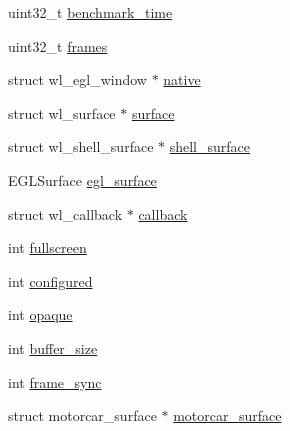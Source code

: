 \begin{DoxyCompactItemize}
\begin{tabbing}
\end{tabbing}\item 
uint32\-\_\-t \hyperlink{structwindow_a72629bf021a361ad900504732a74cb68}{benchmark\-\_\-time}
\item 
uint32\-\_\-t \hyperlink{structwindow_a633864bb495ec265bee220a5c70cc98f}{frames}
\item 
struct wl\-\_\-egl\-\_\-window $\ast$ \hyperlink{structwindow_ae41be0955d0e73530e1bc13dfeb9d731}{native}
\item 
struct wl\-\_\-surface $\ast$ \hyperlink{structwindow_a7d0790cfc7c30621611fa26ab5c1ae97}{surface}
\item 
struct wl\-\_\-shell\-\_\-surface $\ast$ \hyperlink{structwindow_ae4cdc06e4406bc9c168e4a71dcba1103}{shell\-\_\-surface}
\item 
E\-G\-L\-Surface \hyperlink{structwindow_a8de0059f3f1cb0dec33fba1143b7dee1}{egl\-\_\-surface}
\item 
struct wl\-\_\-callback $\ast$ \hyperlink{structwindow_a35ba639556fa19d9273dad0953a6807e}{callback}
\item 
int \hyperlink{structwindow_a8da44798a9e1feb7ed3fbd18ec3a28b6}{fullscreen}
\item 
int \hyperlink{structwindow_af6882ef635ac761ba3f211dabe1db108}{configured}
\item 
int \hyperlink{structwindow_a026a50808d8323a5a73d585c19916fa8}{opaque}
\item 
int \hyperlink{structwindow_a0e634038f669aff472012f25ea250b40}{buffer\-\_\-size}
\item 
int \hyperlink{structwindow_a851bcb65083f5ab5ff768b09522bed70}{frame\-\_\-sync}
\item 
struct motorcar\-\_\-surface $\ast$ \hyperlink{structwindow_a0be16829aad611ea0be83bd985b07302}{motorcar\-\_\-surface}
\end{DoxyCompactItemize}


